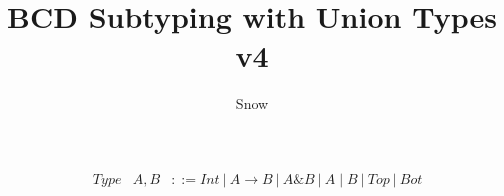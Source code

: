 \documentclass[a4paper]{article}
\title{BCD Subtyping with Union Types v4}
\author{Snow}
\begin{document}
\maketitle

\begin{align*}
&Type &A, B&::= Int ~|~ A\to B ~|~ A\& B ~|~ A\mid B ~|~ Top ~|~ Bot
\end{align*}

\bigskip

\large

\ottdefnsOrdinaryType

\ottdefnsSplitType

\newpage

\ottdefnsOSubtyping

\bigskip\bigskip\bigskip\bigskip\bigskip\bigskip\bigskip\bigskip

\ottdefnsSubtyping
\end{document}
